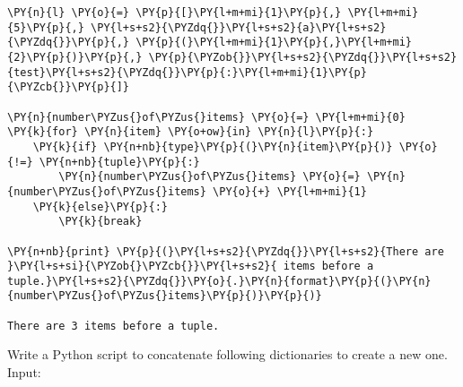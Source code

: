 \begin{Answer}
\begin{tcolorbox}[size=fbox, boxrule=1pt, colback=cellbackground, colframe=cellborder]
\begin{Verbatim}[commandchars=\\\{\}]
\PY{n}{l} \PY{o}{=} \PY{p}{[}\PY{l+m+mi}{1}\PY{p}{,} \PY{l+m+mi}{5}\PY{p}{,} \PY{l+s+s2}{\PYZdq{}}\PY{l+s+s2}{a}\PY{l+s+s2}{\PYZdq{}}\PY{p}{,} \PY{p}{(}\PY{l+m+mi}{1}\PY{p}{,}\PY{l+m+mi}{2}\PY{p}{)}\PY{p}{,} \PY{p}{\PYZob{}}\PY{l+s+s2}{\PYZdq{}}\PY{l+s+s2}{test}\PY{l+s+s2}{\PYZdq{}}\PY{p}{:}\PY{l+m+mi}{1}\PY{p}{\PYZcb{}}\PY{p}{]}

\PY{n}{number\PYZus{}of\PYZus{}items} \PY{o}{=} \PY{l+m+mi}{0}
\PY{k}{for} \PY{n}{item} \PY{o+ow}{in} \PY{n}{l}\PY{p}{:}
    \PY{k}{if} \PY{n+nb}{type}\PY{p}{(}\PY{n}{item}\PY{p}{)} \PY{o}{!=} \PY{n+nb}{tuple}\PY{p}{:}
        \PY{n}{number\PYZus{}of\PYZus{}items} \PY{o}{=} \PY{n}{number\PYZus{}of\PYZus{}items} \PY{o}{+} \PY{l+m+mi}{1}
    \PY{k}{else}\PY{p}{:}
        \PY{k}{break}
        
\PY{n+nb}{print} \PY{p}{(}\PY{l+s+s2}{\PYZdq{}}\PY{l+s+s2}{There are }\PY{l+s+si}{\PYZob{}\PYZcb{}}\PY{l+s+s2}{ items before a tuple.}\PY{l+s+s2}{\PYZdq{}}\PY{o}{.}\PY{n}{format}\PY{p}{(}\PY{n}{number\PYZus{}of\PYZus{}items}\PY{p}{)}\PY{p}{)}

There are 3 items before a tuple.
\end{Verbatim}
\end{tcolorbox}
\end{Answer}

\begin{Exercise}
Write a Python script to concatenate following dictionaries to create a new one.
Input:
\begin{Shaded}
\begin{Highlighting}[]
\OperatorTok{=}\NormalTok{\{}\NormalTok{:}\NormalTok{, }\NormalTok{:}\NormalTok{\}}
\OperatorTok{=}\NormalTok{\{}\NormalTok{:}\NormalTok{, }\NormalTok{:}\NormalTok{\}}
\OperatorTok{=}\NormalTok{\{}\NormalTok{:}\NormalTok{, }\NormalTok{:}\NormalTok{\}}
\end{Highlighting}
\end{Shaded}
\end{Exercise}

